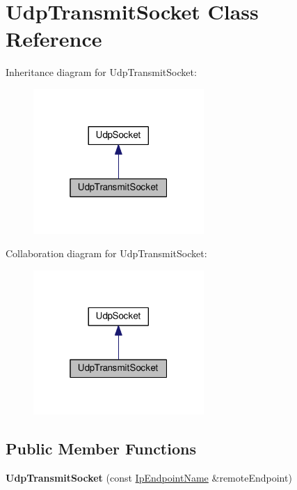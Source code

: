 \hypertarget{class_udp_transmit_socket}{}\section{Udp\+Transmit\+Socket Class Reference}
\label{class_udp_transmit_socket}


Inheritance diagram for Udp\+Transmit\+Socket\+:\nopagebreak
\begin{figure}[H]
\begin{center}
\leavevmode
\includegraphics[width=184pt]{class_udp_transmit_socket__inherit__graph}
\end{center}
\end{figure}


Collaboration diagram for Udp\+Transmit\+Socket\+:\nopagebreak
\begin{figure}[H]
\begin{center}
\leavevmode
\includegraphics[width=184pt]{class_udp_transmit_socket__coll__graph}
\end{center}
\end{figure}
\subsection*{Public Member Functions}
\begin{DoxyCompactItemize}
\item 
\mbox{\label{class_udp_transmit_socket_ad9d308c26c0a9a3b18e05c980d394ed0}} 
{\bfseries Udp\+Transmit\+Socket} (const \hyperlink{class_ip_endpoint_name}{Ip\+Endpoint\+Name} \&remote\+Endpoint)
\end{DoxyCompactItemize}


